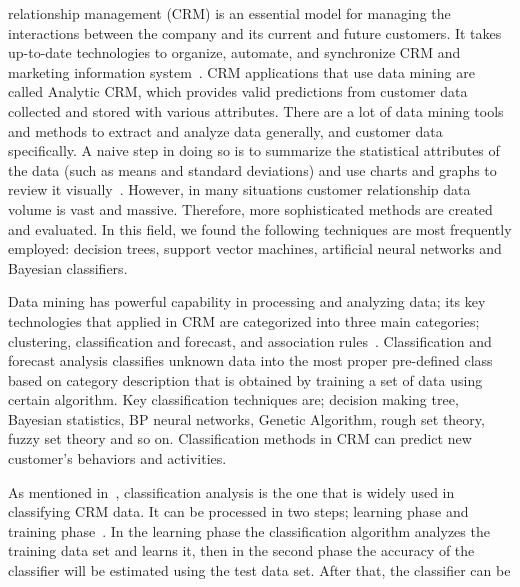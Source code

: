\documentclass[journal]{IEEEtran}
\begin{document}
 relationship management (CRM) is an
essential model for managing the interactions between the company and
its current and future customers. It takes up-to-date technologies to
organize, automate, and synchronize CRM and marketing information
system~\cite{Ref:CustomerRelationshipManagement}. CRM applications
that use data mining are called Analytic CRM, which provides valid
predictions from customer data collected and stored with various
attributes. There are a lot of data mining tools and methods to
extract and analyze data generally, and customer data specifically. A
naive step in doing so is to summarize the statistical attributes of
the data (such as means and standard deviations) and use charts and
graphs to review it
visually~\cite{Ref:DataMiningStrategiesforCRM}. However, in many
situations customer relationship data volume is vast and
massive. Therefore, more sophisticated methods are created and
evaluated. In this field, we found the following techniques are most
frequently employed: decision trees, support vector machines,
artificial neural networks and Bayesian classifiers.
\par
Data mining has powerful capability in processing and analyzing data;
its key technologies that applied in CRM are categorized into three
main categories; clustering, classification and forecast, and
association
rules~\cite{Ref:ApplicationOfDataMiningInCRM}. Classification and
forecast analysis classifies unknown data into the most proper
pre-defined class based on category description that is obtained by
training a set of data using certain algorithm. Key classification
techniques are; decision making tree, Bayesian statistics, BP neural
networks, Genetic Algorithm, rough set theory, fuzzy set theory and so
on. Classification methods in CRM can predict new customer’s behaviors
and activities. 
\par
As mentioned in~\cite{Ref:TargetingCustomers}, classification analysis
is the one that is widely used in classifying CRM data. It can be
processed in two steps; learning phase and training
phase~\cite{Ref:AnalysisOfTheKDDCup2009}. In the learning phase the
classification algorithm analyzes the training data set and learns it,
then in the second phase the accuracy of the classifier will be
estimated using the test data set. After that, the classifier can be
\end{document}
